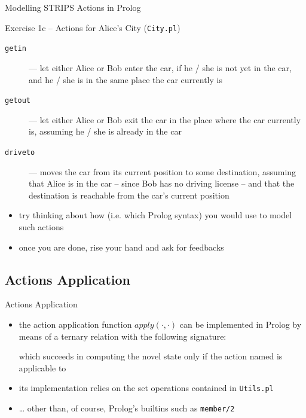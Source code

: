 \documentclass[presentation]{beamer}\mode<presentation>{\usetheme{AMSBolognaFC}}
\begin{document}
\begin{frame}[allowframebreaks]{Modelling STRIPS Actions in Prolog}
\begin{block}{Exercise 1c -- Actions for Alice's City (\texttt{City.pl})}
   	\begin{description}
   	    \item[\texttt{getin}] --- let either Alice or Bob enter the car, if he / she is not yet in the car, and he / she is in the same place the car currently is
   	    \item[\texttt{getout}] --- let either Alice or Bob exit the car in the place where the car currently is, assuming he / she is already in the car
   	    \item[\texttt{driveto}] --- moves the car from its current position to some destination, assuming that Alice is in the car -- since Bob has no driving license -- and that the destination is reachable from the car's current position
   	\end{description}
\end{block}

\begin{itemize}
	\item try thinking about \alert{how} (i.e. which Prolog syntax) you would use to model such actions

	\item once you are done, rise your hand and ask for feedbacks
\end{itemize}
\end{frame}


\subsection{Actions Application}

\begin{frame}[c]{Actions Application}

	\begin{itemize}
		\item the action application function $apply(\cdot, \cdot)$ can be implemented in Prolog by means of a ternary relation with the following signature:
		\begin{center}
		\end{center}
		which succeeds in computing the novel state  only if the action named  is applicable to 

		\vfill

		\item its implementation relies on the set operations contained in \texttt{Utils.pl}

%

		\vfill

		\item \ldots{} other than, of course, Prolog's builtins such as \texttt{member/2}
	\end{itemize}
\end{frame}
\end{document}
